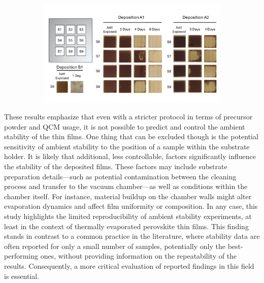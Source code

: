 \begin{figure}[htbp]
    \centering
    \begin{subfigure}[t]{0.99\textwidth}
        \centering
        \includegraphics[width=\textwidth]{chapters/stability/imeges/Stability - Rotation.pdf} %
    \end{subfigure}
    \caption{}
    \label{fig:stability:repeatability}
\end{figure}

These results emphasize that even with a stricter protocol in terms of precursor powder and QCM usage, it is not possible to predict and control the ambient stability of the  thin films. One thing that can be excluded though is the potential sensitivity of ambient stability to the position of a sample within the substrate holder. It is likely that additional, less controllable, factors significantly influence the stability of the deposited films. These factors may include substrate preparation details—such as potential contamination between the cleaning process and transfer to the vacuum chamber—as well as conditions within the chamber itself. For instance, material buildup on the chamber walls might alter evaporation dynamics and affect film uniformity or composition. In any case, this study highlights the limited reproducibility of ambient stability experiments, at least in the context of thermally evaporated perovskite thin films. This finding stands in contrast to a common practice in the literature, where stability data are often reported for only a small number of samples, potentially only the best-performing ones, without providing information on the repeatability of the results. Consequently, a more critical evaluation of reported findings in this field is essential.

